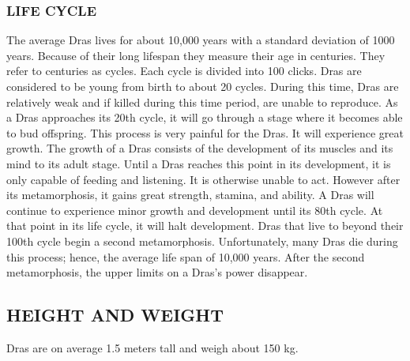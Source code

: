 \subsubsection{LIFE CYCLE}
The average Dras lives for about 10,000 years with a standard deviation of 1000
years.  Because of their long lifespan they measure their age in centuries.
They refer to centuries as cycles.  Each cycle is divided into 100 clicks.
Dras are considered to be young from birth to about 20 cycles.  During this
time, Dras are relatively weak and if killed during this time period, are
unable to reproduce.  As a Dras approaches its 20th cycle, it will go through a
stage where it becomes able to bud offspring.  This process is very painful for
the Dras.  It will experience great growth.  The growth of a Dras consists of
the development of its muscles and its mind to its adult stage.  Until a Dras
reaches this point in its development, it is only capable of feeding and
listening.  It is otherwise unable to act.  However after its metamorphosis, it
gains great strength, stamina, and ability.  A Dras will continue to experience
minor growth and development until its 80th cycle.  At that point in its life
cycle, it will halt development.  Dras that live to beyond their 100th cycle
begin a second metamorphosis.  Unfortunately, many Dras die during this
process; hence, the average life span of 10,000 years.  After the second
metamorphosis, the upper limits on a Dras's power disappear.
\subsection{HEIGHT AND WEIGHT}
Dras are on average 1.5 meters tall and weigh about 150 kg.
